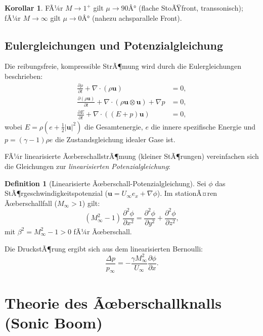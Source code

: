 ﻿\documentclass[12pt,a4paper]{article}
\theoremstyle{definition}
\newtheorem{definition}{Definition}[section]
\newtheorem{korollar}{Korollar}[section]
\theoremstyle{remark}
\newcommand{\pdd}[2]{\frac{\partial #1}{\partial #2}}
\begin{document}
\begin{korollar}
  FÃ¼r $M \to 1^+$ gilt $\mu \to 90Â°$ (flache StoÃŸfront, transsonisch);
  fÃ¼r $M \to \infty$ gilt $\mu \to 0Â°$ (nahezu achsparallele Front).
\end{korollar}

\subsection{Eulergleichungen und Potenzialgleichung}

Die reibungsfreie, kompressible StrÃ¶mung wird durch die Eulergleichungen beschrieben:
\begin{align}
  \pdd{\rho}{t} + \nabla \cdot (\rho \mathbf{u}) &= 0, \label{eq:kontinuitÃ¤t}\\
  \pdd{(\rho \mathbf{u})}{t} + \nabla \cdot (\rho \mathbf{u} \otimes \mathbf{u}) + \nabla p &= 0, \label{eq:impuls}\\
  \pdd{E}{t} + \nabla \cdot ((E + p)\mathbf{u}) &= 0, \label{eq:energie}
\end{align}
wobei $E = \rho(e + \tfrac{1}{2}|\mathbf{u}|^2)$ die Gesamtenergie, $e$ die innere
spezifische Energie und $p = (\gamma - 1)\rho e$ die Zustandsgleichung idealer Gase ist.

FÃ¼r linearisierte ÃœberschallstrÃ¶mung (kleiner StÃ¶rungen) vereinfachen sich die Gleichungen
zur \emph{linearisierten Potenzialgleichung}:

\begin{definition}[Linearisierte Ãœberschall-Potenzialgleichung]
  Sei $\phi$ das StÃ¶rgeschwindigkeitspotenzial ($\mathbf{u} = U_\infty \hat{e}_x + \nabla\phi$).
  Im stationÃ¤ren Ãœberschallfall ($M_\infty > 1$) gilt:
  \begin{equation}
    (M_\infty^2 - 1)\, \pdd{^2\phi}{x^2} = \pdd{^2\phi}{y^2} + \pdd{^2\phi}{z^2},
    \label{eq:potential}
  \end{equation}
  mit $\beta^2 = M_\infty^2 - 1 > 0$ fÃ¼r Ãœberschall.
\end{definition}

Die DruckstÃ¶rung ergibt sich aus dem linearisierten Bernoulli:
\begin{equation}
  \frac{\Delta p}{p_\infty} = -\frac{\gamma M_\infty^2}{U_\infty} \pdd{\phi}{x}.
  \label{eq:druck_stoerung}
\end{equation}

\section{Theorie des Ãœberschallknalls (Sonic Boom)}
\label{sec:sonicboom}
\end{document}
